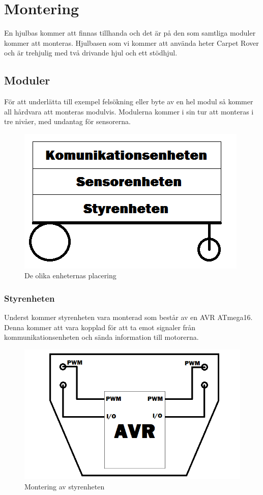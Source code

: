 \section{Montering}
En hjulbas kommer att finnas tillhanda och det är på den som samtliga moduler kommer att monteras. Hjulbasen som vi kommer att använda heter Carpet Rover och är trehjulig med två drivande hjul och ett stödhjul.

\subsection{Moduler}
För att underlätta till exempel felsökning eller byte av en hel modul så kommer all hårdvara att monteras modulvis. Modulerna kommer i sin tur att monteras i tre nivåer, med undantag för sensorerna. 

\begin{figure}[H]
\includegraphics[angle=0,scale=0.5]{bilder/enheter.png}
  \centering
  \caption{De olika enheternas placering}
  \label{fig:enheter}
\end{figure}

\subsubsection{Styrenheten}
Underst kommer styrenheten vara monterad som består av en AVR ATmega16. Denna kommer att vara kopplad för att ta emot signaler från kommunikationsenheten och sända information till motorerna.

\begin{figure}[H]
\includegraphics[angle=0,scale=0.5]{bilder/styrenhet.png}
  \centering
  \caption{Montering av styrenheten}
  \label{fig:styrenhet}
\end{figure}

